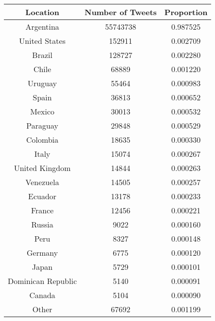 \begin{table}
\centering
\begin{subtable}[c]{0.5\textwidth}
\centering
    \begin{tabular}{|c|c|c|}
    \hline
    Location & Number of Tweets & Proportion \\
    \hline
    Argentina & 55743738 & 0.987525 \\
    United States & 152911 & 0.002709 \\
    Brazil & 128727 & 0.002280 \\
    Chile & 68889 & 0.001220 \\
    Uruguay & 55464 & 0.000983 \\
    Spain & 36813 & 0.000652 \\
    Mexico & 30013 & 0.000532 \\
    Paraguay & 29848 & 0.000529 \\
    Colombia & 18635 & 0.000330 \\
    Italy & 15074 & 0.000267 \\
    United Kingdom & 14844 & 0.000263 \\
    Venezuela & 14505 & 0.000257 \\
    Ecuador & 13178 & 0.000233 \\
    France & 12456 & 0.000221 \\
    Russia & 9022 & 0.000160 \\
    Peru & 8327 & 0.000148 \\
    Germany & 6775 & 0.000120 \\
    Japan & 5729 & 0.000101 \\
    Dominican Republic & 5140 & 0.000091 \\
    Canada & 5104 & 0.000090 \\
    Other & 67692 & 0.001199 \\
    \hline
    \end{tabular}
\end{subtable}


\end{table}
